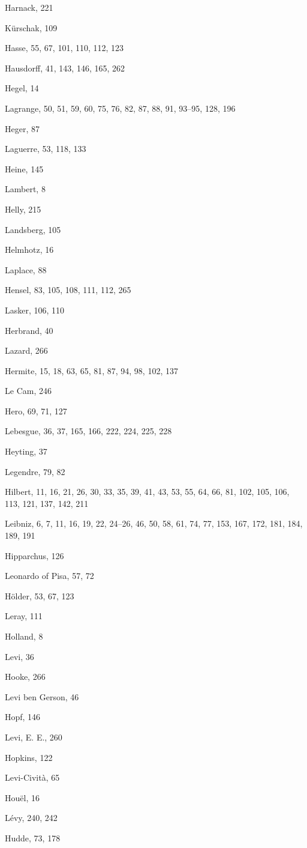 Harnack, 221

Kürschak, 109

Hasse, 55, 67, 101, 110, 112, 123

Hausdorff, 41, 143, 146, 165, 262

Hegel, 14

Lagrange, 50, 51, 59, 60, 75, 76, 82, 87, 88, 91, 93--95, 128, 196

Heger, 87

Laguerre, 53, 118, 133

Heine, 145

Lambert, 8

Helly, 215

Landsberg, 105

Helmhotz, 16

Laplace, 88

Hensel, 83, 105, 108, 111, 112, 265

Lasker, 106, 110

Herbrand, 40

Lazard, 266

Hermite, 15, 18, 63, 65, 81, 87, 94, 98, 102, 137

Le Cam, 246

Hero, 69, 71, 127

Lebesgue, 36, 37, 165, 166, 222, 224, 225, 228

Heyting, 37

Legendre, 79, 82

Hilbert, 11, 16, 21, 26, 30, 33, 35, 39, 41, 43, 53, 55, 64, 66, 81, 102, 105, 106, 113, 121, 137, 142, 211

Leibniz, 6, 7, 11, 16, 19, 22, 24--26, 46, 50, 58, 61, 74, 77, 153, 167, 172, 181, 184, 189, 191

Hipparchus, 126

Leonardo of Pisa, 57, 72

Hölder, 53, 67, 123

Leray, 111

Holland, 8

Levi, 36

Hooke, 266

Levi ben Gerson, 46

Hopf, 146

Levi, E. E., 260

Hopkins, 122

Levi-Cività, 65

Houël, 16

Lévy, 240, 242

Hudde, 73, 178

